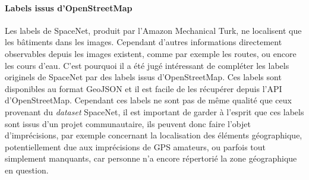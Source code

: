 \documentclass[a4paper, 11pt]{report}
\begin{document}
\paragraph{Labels issus d'OpenStreetMap}
Les labels de SpaceNet, produit par l'Amazon Mechanical Turk, ne localisent que les bâtiments dans les images. Cependant d'autres informations directement observables depuis les images existent, comme par exemple les routes, ou encore les cours d'eau.
C'est pourquoi il a été jugé intéressant de compléter les labels originels de SpaceNet par des labels issus d'OpenStreetMap.
Ces labels sont disponibles au format GeoJSON et il est facile de les récupérer depuis l'API d'OpenStreetMap.
Cependant ces labels ne sont pas de même qualité que ceux provenant du \emph{dataset} SpaceNet, il est important de garder à l'esprit que ces labels sont issus d'un projet communautaire, ils peuvent donc faire l'objet d'imprécisions, par exemple concernant la localisation des éléments géographique, potentiellement due aux imprécisions de GPS amateurs, ou parfois tout simplement manquants, car personne n'a encore répertorié la zone géographique en question.
\end{document}
